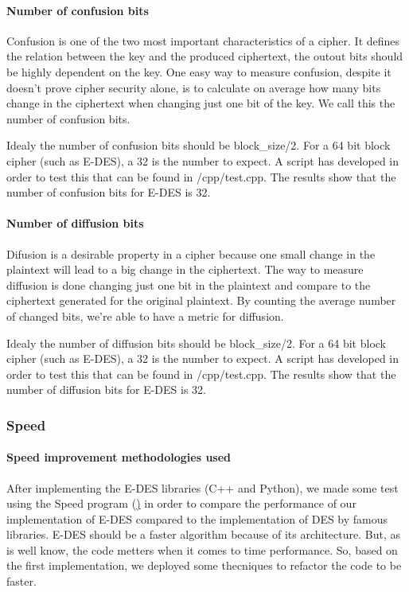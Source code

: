 \documentclass{article} %
\begin{document}
\paragraph{Number of confusion bits}
Confusion is one of the two most important characteristics of a cipher. It defines the relation between the key and the produced ciphertext, the outout bits should be 
highly dependent on the key. One easy way to measure confusion, despite it doesn't prove cipher security alone, is to calculate on average how many bits change in the 
ciphertext when changing just one bit of the key. We call this the number of confusion bits.

Idealy the number of confusion bits should be block\_size/2. For a 64 bit block cipher (such as E-DES), a 32 is the number to expect. A script has developed in order
to test this that can be found in /cpp/test.cpp. The results show that the number of confusion bits for E-DES is 32.

\paragraph{Number of diffusion bits }
Difusion is a desirable property in a cipher because one small change in the plaintext will lead to a big change in the ciphertext. 
The way to measure diffusion is done changing just one bit in the plaintext and compare to the ciphertext generated for the original plaintext. By counting the average number
of changed bits, we're able to have a metric for diffusion. 

Idealy the number of diffusion bits should be block\_size/2. For a 64 bit block cipher (such as E-DES), a 32 is the number to expect. A script has developed in order
to test this that can be found in /cpp/test.cpp. The results show that the number of diffusion bits for E-DES is 32.


\subsubsection{Speed}
\label{speedinp}
\paragraph{Speed improvement methodologies used}

After implementing the E-DES libraries (C++ and Python), we made some test using the Speed program (\href{speed}) in order to compare the performance of our implementation
of E-DES compared to the implementation of DES by famous libraries. E-DES should be a faster algorithm because of its architecture. But, as is well know, the code metters
when it comes to time performance. So, based on the first implementation, we deployed some thecniques to refactor the code to be faster.
\end{document}
